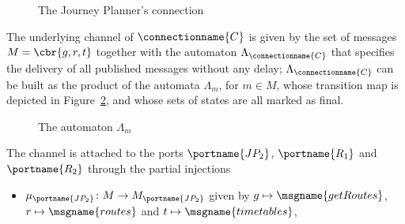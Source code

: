 \documentclass{LMCS}
\begin{document}
\begin{exa}
\begin{figure}[h]

      \caption{The Journey Planner's connection}
      \label{figure:journey-planner-connection}
    \end{figure}
    
    The underlying channel of \(\connectionname{C}\) is given by the set of messages \(M = \cbr{g, r, t}\) together with the automaton \(\Lambda_{\connectionname{C}}\) that specifies the delivery of all published messages without any delay; \(\Lambda_{\connectionname{C}}\) can be built as the product of the automata \(\Lambda_{m}\), for \(m \in M\), whose transition map is depicted in Figure~\ref{figure:connection-LM-automaton}, and whose sets of states are all marked as final.

    \begin{figure}[h]
      \centering
      

      \caption{The automaton \(\Lambda_{m}\)}
      \label{figure:connection-LM-automaton}
    \end{figure}

    The channel is attached to the ports \(\portname{JP_{2}}\), \(\portname{R_{1}}\) and \(\portname{R_{2}}\) through the partial injections
    \begin{itemize}
      
    \item \(\mu_{\portname{{JP_{2}}}} \colon M \to M_{\portname{JP_{2}}}\) given by \(g \mapsto \msgname{getRoutes}\), \(r \mapsto \msgname{routes}\) and \(t \mapsto \msgname{timetables}\),
      

\end{itemize}
\end{exa}
\end{document}
